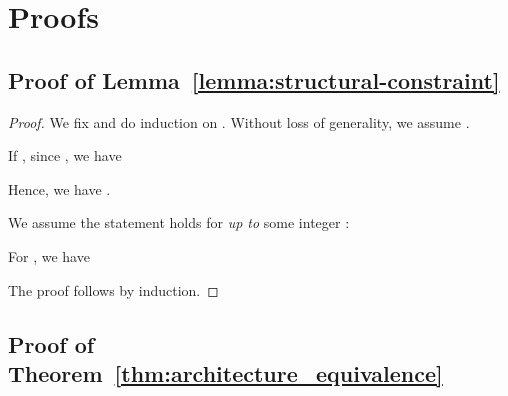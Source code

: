 \documentclass{article} \usepackage{iclr2020_conference,times}
\begin{document}



\newpage

\appendix
\section{Proofs}
\subsection{Proof of Lemma~\ref{lemma:structural-constraint}}
\label{appendix:proof:structural-constraint}
\begin{proof}
We fix  and do induction on . Without loss of generality, we assume .

If , since , we have

Hence, we have . 

We assume the statement holds for \emph{up to} some integer :

For , we have 

The proof follows by induction.
\end{proof}

\subsection{Proof of Theorem~\ref{thm:architecture_equivalence}}\label{appendix:proof:architect}
\end{document}
